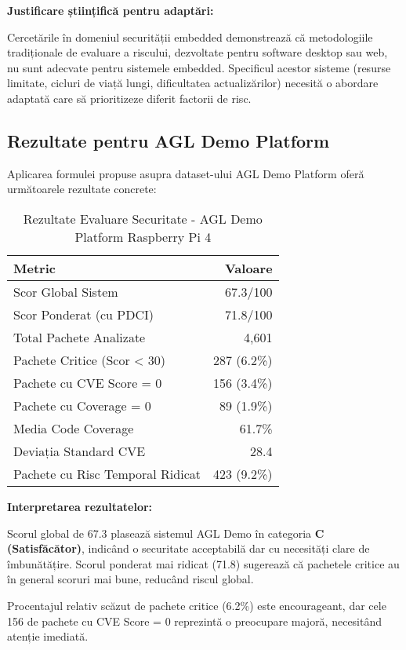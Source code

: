 \documentclass[12pt,a4paper]{article}
\begin{document}
\textbf{Justificare științifică pentru adaptări:}

Cercetările în domeniul securității embedded demonstrează că metodologiile tradiționale de evaluare a riscului, dezvoltate pentru software desktop sau web, nu sunt adecvate pentru sistemele embedded. Specificul acestor sisteme (resurse limitate, cicluri de viață lungi, dificultatea actualizărilor) necesită o abordare adaptată care să prioritizeze diferit factorii de risc.

\subsection{Rezultate pentru AGL Demo Platform}

Aplicarea formulei propuse asupra dataset-ului AGL Demo Platform oferă următoarele rezultate concrete:

\begin{table}[H]
\centering
\caption{Rezultate Evaluare Securitate - AGL Demo Platform Raspberry Pi 4}
\begin{tabular}{@{}lr@{}}
\toprule
\textbf{Metric} & \textbf{Valoare} \\
\midrule
Scor Global Sistem & 67.3/100 \\
Scor Ponderat (cu PDCI) & 71.8/100 \\
Total Pachete Analizate & 4,601 \\
Pachete Critice (Scor < 30) & 287 (6.2\%) \\
Pachete cu CVE Score = 0 & 156 (3.4\%) \\
Pachete cu Coverage = 0 & 89 (1.9\%) \\
Media Code Coverage & 61.7\% \\
Deviația Standard CVE & 28.4 \\
Pachete cu Risc Temporal Ridicat & 423 (9.2\%) \\
\bottomrule
\end{tabular}
\end{table}

\textbf{Interpretarea rezultatelor:}

Scorul global de 67.3 plasează sistemul AGL Demo în categoria \textbf{C (Satisfăcător)}, indicând o securitate acceptabilă dar cu necesități clare de îmbunătățire. Scorul ponderat mai ridicat (71.8) sugerează că pachetele critice au în general scoruri mai bune, reducând riscul global.

Procentajul relativ scăzut de pachete critice (6.2\%) este encourageant, dar cele 156 de pachete cu CVE Score = 0 reprezintă o preocupare majoră, necesitând atenție imediată.
\end{document}
